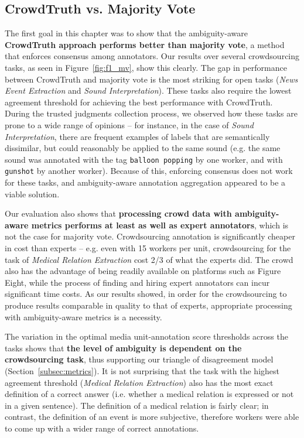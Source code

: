 \subsection{CrowdTruth vs. Majority Vote}


The first goal in this chapter was to show that the ambiguity-aware \textbf{CrowdTruth approach performs better than majority vote}, a method that enforces consensus among annotators.  Our results over several crowdsourcing tasks, as seen in Figure~\ref{fig:f1_mv}, show this clearly. The gap in performance between CrowdTruth and majority vote is the most striking for open tasks (\textit{News Event Extraction} and \textit{Sound Interpretation}).  These tasks also require the lowest agreement threshold for achieving the best performance with CrowdTruth.  During the trusted judgments collection process, we observed how these tasks are prone to a wide range of opinions -- for instance, in the case of \textit{Sound Interpretation}, there are frequent examples of labels that are semantically dissimilar, but could reasonably be applied to the same sound (e.g. the same sound was annotated with the tag \texttt{balloon popping} by one worker, and with \texttt{gunshot} by another worker).  Because of this, enforcing consensus does not work for these tasks, and ambiguity-aware annotation aggregation appeared to be a viable solution.

Our evaluation also shows that \textbf{processing crowd data with ambiguity-aware metrics performs at least as well as expert annotators}, which is not the case for majority vote.  Crowdsourcing annotation is significantly cheaper in cost than experts --  e.g. even with 15 workers per unit, crowdsourcing for the task of \textit{Medical Relation Extraction} cost 2/3 of what the experts did. The crowd also has the advantage of being readily available on platforms such as Figure Eight, while the process of finding and hiring expert annotators can incur significant time costs. As our results showed, in order for the crowdsourcing to produce results comparable in quality to that of experts, appropriate processing with ambiguity-aware metrics is a necessity.

The variation in the optimal media unit-annotation score thresholds across the tasks shows that \textbf{the level of ambiguity is dependent on the crowdsourcing task}, thus supporting our triangle of disagreement model (Section~\ref{subsec:metrics}).  It is not surprising that the task with the highest agreement threshold (\textit{Medical Relation Extraction}) also has the most exact definition of a correct answer (i.e. whether a medical relation is expressed or not in a given sentence).  The definition of a medical relation is fairly clear; in contrast, the definition of an event is more subjective, therefore workers were able to come up with a wider range of correct annotations.

